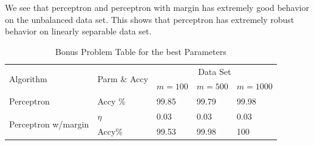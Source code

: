 \noindent We see that perceptron and perceptron with margin has extremely good behavior on the unbalanced data set. This shows that perceptron has extremely robust behavior on linearly separable data set. 
\begin{center}
	\begin{table}
		\begin{tabular}{|p{4.3cm}<{\centering}|p{2.5cm}<{\centering}|p{2.7cm}<{\centering}|p{2.7cm}<{\centering}|p{2.7cm}<{\centering}|}
			\hline
			\multirow{2}{*}{Algorithm} & \multirow{2}{*}{Parm \& Accy} & \multicolumn{3}{|c|}{Data Set} \\
			\cline{3-5}
			& & $m=100$& $m=500$& $m=1000$\\
			\hline
			Perceptron    & Accy \%               &            99.85                 &  99.79 &             99.98                  \\ \hline
			\multirow{2}{*}{Perceptron w/margin} &          $\eta$          &         0.03          &    0.03 &            0.03                   \\
			\cline{2-5}
			& Accy\% &  99.53& 99.98& 100\\ \hline %
		\end{tabular}
			\caption{Bonus Problem Table for the best Parameters}
	\end{table}
\end{center}



